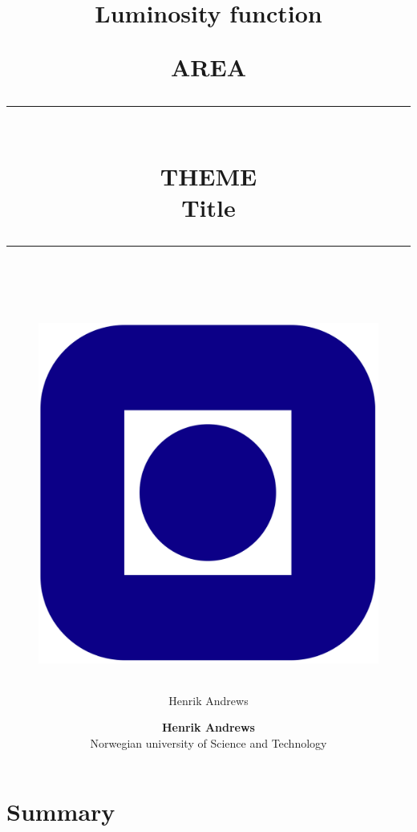 \documentclass{article}
\title{Luminosity function}
\author{Henrik Andrews}
\newcommand{\HRule}[1]{\rule{\linewidth}{#1}}
\begin{document}
\title{ \normalsize \textsc{AREA}
	\\ [2.0cm]
	\HRule{0.5pt} \\
	\LARGE \textbf{\uppercase{Theme}}		
	\\ Title\\
	\HRule{2pt} \\ [0.5cm]		
	\vspace{6cm}
	\begin{figure}[htp]
    \centering
    \includegraphics[width=.2\textwidth]{Logo-Ntnu.svg.png}
    \end{figure}
	}

\author{
    \normalsize 
	\textbf{Henrik Andrews } \\
	Norwegian university of Science and Technology \\ 
}

\maketitle
\setcounter{page}{ 0 }

\newpage

\pagestyle{fancy}
\fancyhf{}
\setlength\headheight{12pt}
\setcounter{page}{1}



\maketitle

\begin{abstract}
\lipsum[1] %
\end{abstract}

\newpage 
\section*{Summary}
\lipsum[2] %

\newpage
\end{document}
